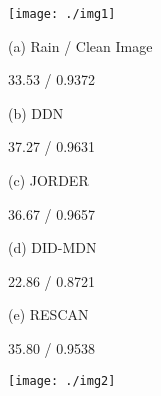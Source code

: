 \documentclass[10pt,twocolumn,letterpaper]{article}
\begin{document}
\begin{figure*}[t]
\centering
\begin{minipage}[t]{0.85\textwidth}
\centering
\texttt{[image: ./img1]}
\end{minipage}

\begin{minipage}[t]{0.17\textwidth}
\centerline{\footnotesize (a) Rain / Clean Image}
\centerline{\footnotesize 33.53 / 0.9372 }
\end{minipage}
\centering
\begin{minipage}[t]{0.17\linewidth}
\centerline{\footnotesize (b) DDN~\cite{fu:cvpe:2017:ddn}}
\centerline{\footnotesize 37.27 / 0.9631}
\end{minipage}
\begin{minipage}[t]{0.17\linewidth}
\centerline{\footnotesize (c) JORDER~\cite{yang:cvpr:2017:j}}
\centerline{\footnotesize 36.67 / 0.9657 }
\end{minipage}
\begin{minipage}[t]{0.17\linewidth}
\centerline{\footnotesize (d) DID-MDN~\cite{zhang:cvpr:2018:did}}
\centerline{\footnotesize 22.86 / 0.8721 }
\end{minipage}
\begin{minipage}[t]{0.17\linewidth}
\centerline{\footnotesize (e) RESCAN~\cite{li:eccv:2018:rsecan}}
\centerline{\footnotesize 35.80 / 0.9538}
\end{minipage}

\begin{minipage}[t]{\textwidth}
\centerline{  }
\end{minipage}

\begin{minipage}[t]{0.85\textwidth}
\texttt{[image: ./img2]}
\end{minipage}


\end{figure*}
\end{document}
